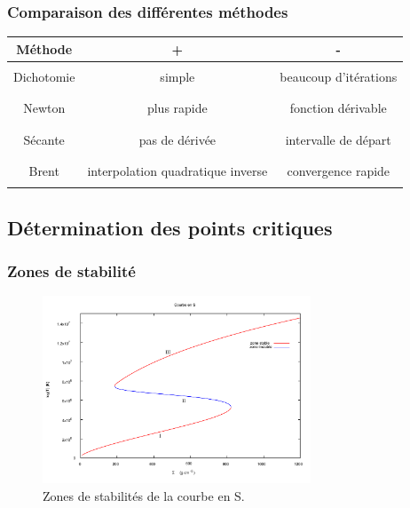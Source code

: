 \documentclass[french]{beamer}
\begin{document}
\begin{frame}
\frametitle{Comparaison des différentes méthodes}

\begin{tabular}{|c|c|c|}
  \hline
  Méthode & + & - \\
  \hline
  \\
  Dichotomie & simple & beaucoup d'itérations  \\
  \\  
  \hline
  \\
  Newton & plus rapide  & fonction dérivable \\
  \\ 
  \hline
  \\  
  Sécante & pas de dérivée & intervalle de départ \\
  \\  
  \hline  
  \\  
  Brent & interpolation quadratique inverse & convergence rapide \\
  \\  
  \hline
\end{tabular}
\end{frame}



\begin{frame}
\section{Détermination des points critiques}
\frametitle{Zones de stabilité}
\begin{figure}[htb!]
\includegraphics[width=8cm]{figures/stable.pdf}
\caption{Zones de stabilités de la courbe en S.}
\end{figure}
\end{frame}
\end{document}
